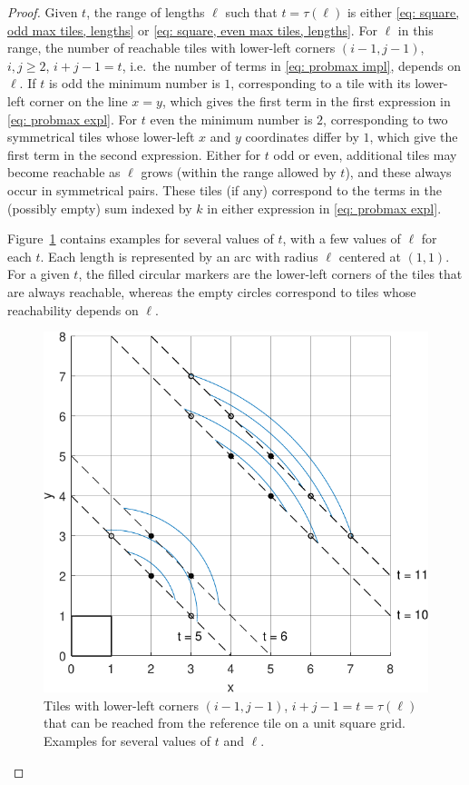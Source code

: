 \documentclass[12pt, a4paper]{article}
\newcommand{\funt}{\tau} %
\newcommand{\len}{\ell} %
\newcommand{\tiles}{t} %
\begin{document}
\begin{proof}
Given $\tiles$, the range of lengths $\len$ such that $\tiles = \funt(\len)$ is either \eqref{eq: square, odd max tiles, lengths} or \eqref{eq: square, even max tiles, lengths}. For $\len$ in this range, the number of reachable tiles with lower-left corners $(i-1,j-1)$, $i,j \geq 2$, $i+j-1=\tiles$, i.e.~the number of terms in \eqref{eq: probmax impl}, depends on $\len$. If $\tiles$ is odd the minimum number is $1$, corresponding to a tile with its lower-left corner on the line $x=y$, which gives the first term in the first expression in \eqref{eq: probmax expl}. For $\tiles$ even the minimum number is $2$, corresponding to two symmetrical tiles whose lower-left $x$ and $y$ coordinates differ by $1$, which give the first term in the second expression. Either for $\tiles$ odd or even, additional tiles may become reachable as $\len$ grows (within the range allowed by $\tiles$), and these always occur in symmetrical pairs. These tiles (if any) correspond to the terms in the (possibly empty) sum indexed by $k$ in either expression in \eqref{eq: probmax expl}. 

Figure~\ref{fig: probmax_terms} contains examples for several values of $\tiles$, with a few values of $\len$ for each $\tiles$. Each length is represented by an arc with radius $\len$ centered at $(1,1)$. For a given $\tiles$, the filled circular markers are the lower-left corners of the tiles that are always reachable, whereas the empty circles correspond to tiles whose reachability depends on $\len$.

\begin{figure}
\centering
\includegraphics[width=.7\textwidth]{probmax_terms}%
\caption{Tiles with lower-left corners $(i-1,j-1)$, $i+j-1=\tiles=\funt(\len)$ that can be reached from the reference tile on a unit square grid. Examples for several values of $\tiles$ and $\len$.
}%
\label{fig: probmax_terms}%
\end{figure}%


\end{proof}
\end{document}
